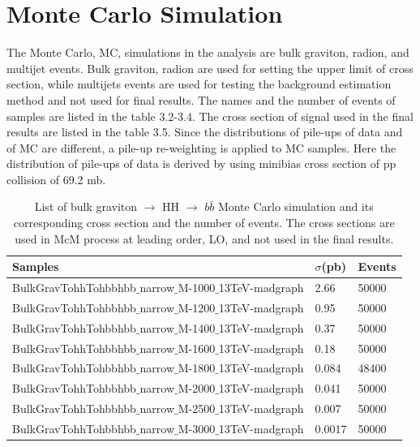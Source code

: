 \section{Monte Carlo Simulation} \label{Monte Carlo Simulation}	
The Monte Carlo, MC, simulations in the analysis are bulk graviton, radion, and multijet events. Bulk graviton, radion are used for setting the upper limit of cross section, while multijets events are used for testing the background estimation method and not used for final results. The names and the number of events of samples are listed in the table 3.2-3.4. The cross section of signal used in the final results are listed in the table 3.5. Since the distributions of pile-ups of data and of MC are different, a pile-up re-weighting is applied to MC samples. Here the distribution of pile-ups of data is derived by using minibias cross section of pp collision of 69.2 mb.%
\begin{table}[h!]
  \begin{center}
    \begin{tabular}{l|l|l}
    Samples & $\sigma$(pb) & Events \\
    \hline
    BulkGravTohhTohbbhbb$\_$narrow$\_$M-1000$\_$13TeV-madgraph & 2.66 & 50000 \\
    BulkGravTohhTohbbhbb$\_$narrow$\_$M-1200$\_$13TeV-madgraph & 0.95 & 50000 \\
    BulkGravTohhTohbbhbb$\_$narrow$\_$M-1400$\_$13TeV-madgraph & 0.37 & 50000 \\
    BulkGravTohhTohbbhbb$\_$narrow$\_$M-1600$\_$13TeV-madgraph & 0.18 & 50000 \\
    BulkGravTohhTohbbhbb$\_$narrow$\_$M-1800$\_$13TeV-madgraph & 0.084 & 48400 \\
    BulkGravTohhTohbbhbb$\_$narrow$\_$M-2000$\_$13TeV-madgraph & 0.041 & 50000 \\
    BulkGravTohhTohbbhbb$\_$narrow$\_$M-2500$\_$13TeV-madgraph & 0.007 & 50000 \\
    BulkGravTohhTohbbhbb$\_$narrow$\_$M-3000$\_$13TeV-madgraph & 0.0017 & 50000 \\
    	\hline
    \end{tabular}
  \end{center}

  \caption{List of bulk graviton $\rightarrow$ HH $\rightarrow$ $b\bar{b}$ Monte Carlo simulation and its corresponding cross section and the number of events. The cross sections are used in McM process at leading order, LO, and not used in the final results.}
\end{table} 


